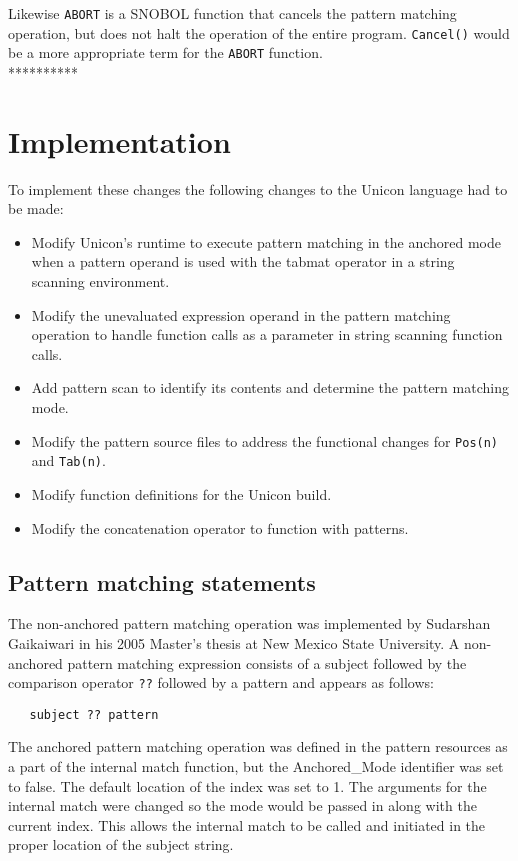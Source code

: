 \documentclass{article}
\begin{document}
Likewise \texttt{ABORT} is a SNOBOL function that cancels the pattern matching operation, but does not halt the operation of the entire program.  \texttt{Cancel()} would be a more appropriate term for the \texttt{ABORT} function. \\
**********
\section{Implementation}
To implement these changes the following changes to the Unicon language had to be made:
\begin{itemize}
\item Modify Unicon's runtime to execute pattern matching in the anchored mode when a pattern operand is used with the tabmat operator in a string scanning environment.
\item Modify the unevaluated expression operand in the pattern matching operation to handle function calls as a parameter in string scanning function calls.
\item Add pattern scan to identify its contents and determine the pattern matching mode.
\item Modify the pattern source files to address the functional changes for \texttt{Pos(n)} and \texttt{Tab(n)}.
\item Modify function definitions for the Unicon build.
\item Modify the concatenation operator to function with patterns.
\end{itemize}

\subsection{Pattern matching statements}
The non-anchored pattern matching operation was implemented by Sudarshan Gaikaiwari in his 2005 Master's thesis at New Mexico State University.  A non-anchored pattern matching expression consists of a subject followed by the comparison operator \texttt{??} followed by a pattern and appears as follows:

\begin{verbatim}
   subject ?? pattern
\end{verbatim}

The anchored pattern matching operation was defined in the pattern resources as a part of the internal match function, but the Anchored\_Mode identifier was set to false.  The default location of the index was set to 1.  The arguments for the internal match were changed so the mode would be passed in along with the current index.  This allows the internal match to be called and initiated in the proper location of the subject string.
\end{document}
